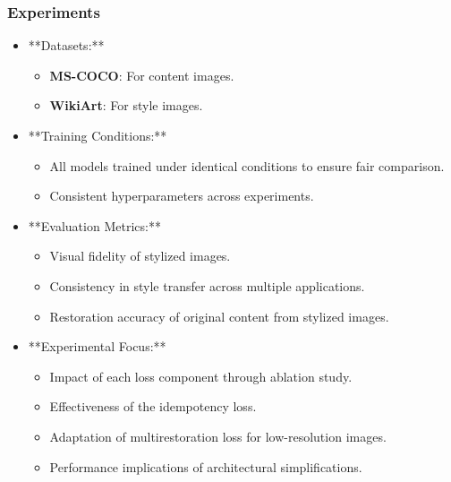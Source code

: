 \begin{frame}
\frametitle{Experiments}

\begin{itemize}
    \item **Datasets:**
    \begin{itemize}
        \item \textbf{MS-COCO}: For content images.
        \item \textbf{WikiArt}: For style images.
    \end{itemize}
    \item **Training Conditions:**
    \begin{itemize}
        \item All models trained under identical conditions to ensure fair comparison.
        \item Consistent hyperparameters across experiments.
    \end{itemize}
    \item **Evaluation Metrics:**
    \begin{itemize}
        \item Visual fidelity of stylized images.
        \item Consistency in style transfer across multiple applications.
        \item Restoration accuracy of original content from stylized images.
    \end{itemize}
    \item **Experimental Focus:**
    \begin{itemize}
        \item Impact of each loss component through ablation study.
        \item Effectiveness of the idempotency loss.
        \item Adaptation of multirestoration loss for low-resolution images.
        \item Performance implications of architectural simplifications.
    \end{itemize}
\end{itemize}

\end{frame}
